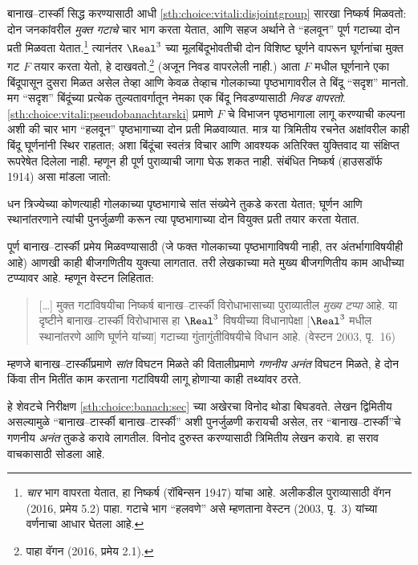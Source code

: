 बानाख--टार्स्की सिद्ध करण्यासाठी आधी \ref{sth:choice:vitali:disjointgroup} सारखा निष्कर्ष मिळवतो: दोन जनकांवरील \emph{मुक्त गटाचे} चार भाग करता येतात, आणि सहज अर्थाने ते “हलवून” पूर्ण गटाच्या दोन प्रती मिळवता येतात.\footnote{\emph{चार} भाग वापरता येतात, हा निष्कर्ष (रॉबिन्सन 1947) यांचा आहे. अलीकडील पुराव्यासाठी वॅगन (2016, प्रमेय 5.2) पाहा. गटाचे भाग “हलवणे” असे म्हणताना वेस्टन (2003, पृ.~3) यांच्या वर्णनाचा आधार घेतला आहे.} त्यानंतर $\Real^3$ च्या मूलबिंदूभोवतीची दोन विशिष्ट घूर्णने वापरून घूर्णनांचा मुक्त गट $F$ तयार करता येतो, हे दाखवतो.\footnote{पाहा वॅगन (2016, प्रमेय 2.1).} (अजून निवड वापरलेली नाही.) आता $F$ मधील घूर्णनाने एका बिंदूपासून दुसरा मिळत असेल तेव्हा आणि केवळ तेव्हाच गोलकाच्या पृष्ठभागावरील ते बिंदू “सदृश” मानतो. मग “सदृश” बिंदूंच्या प्रत्येक तुल्यतावर्गातून नेमका एक बिंदू निवडण्यासाठी \emph{निवड वापरतो}. \ref{sth:choice:vitali:pseudobanachtarski} प्रमाणे $F$ चे विभाजन पृष्ठभागाला लागू करण्याची कल्पना अशी की चार भाग “हलवून” पृष्ठभागाच्या दोन प्रती मिळवाव्यात. मात्र या त्रिमितीय रचनेत अक्षांवरील काही बिंदू घूर्णनांनी स्थिर राहतात; अशा बिंदूंचा स्वतंत्र विचार आणि आवश्यक अतिरिक्त युक्तिवाद या संक्षिप्त रूपरेषेत दिलेला नाही. म्हणून ही पूर्ण पुराव्याची जागा घेऊ शकत नाही. संबंधित निष्कर्ष (हाउसडॉर्फ 1914) असा मांडला जातो:

\begin{thm}
धन त्रिज्येच्या कोणत्याही गोलकाच्या पृष्ठभागाचे सांत संख्येने तुकडे करता येतात; घूर्णन आणि स्थानांतरणाने त्यांची पुनर्जुळणी करून त्या पृष्ठभागाच्या दोन वियुक्त प्रती तयार करता येतात.
\end{thm}

पूर्ण बानाख--टार्स्की प्रमेय मिळवण्यासाठी (जे फक्त गोलकाच्या पृष्ठभागाविषयी नाही, तर अंतर्भागाविषयीही आहे) आणखी काही बीजगणितीय युक्त्या लागतात. तरी लेखकाच्या मते मुख्य बीजगणितीय काम आधीच्या टप्प्यावर आहे. म्हणून वेस्टन लिहितात:
\begin{quote}
  [\ldots] मुक्त गटांविषयीचा निष्कर्ष बानाख--टार्स्की विरोधाभासाच्या पुराव्यातील \emph{मुख्य टप्पा} आहे. या दृष्टीने बानाख--टार्स्की विरोधाभास हा $\Real^3$ विषयीच्या विधानापेक्षा [$\Real^3$ मधील स्थानांतरणे आणि घूर्णने यांच्या] गटाच्या गुंतागुंतीविषयीचे विधान आहे. (वेस्टन 2003, पृ.~16)
\end{quote}
म्हणजे बानाख--टार्स्कीप्रमाणे \emph{सांत} विघटन मिळते की वितालीप्रमाणे \emph{गणनीय अनंत} विघटन मिळते, हे दोन किंवा तीन मितींत काम करताना गटांविषयी लागू होणाऱ्या काही तथ्यांवर ठरते.

हे शेवटचे निरीक्षण \ref{sth:choice:banach:sec} च्या अखेरचा विनोद थोडा बिघडवते. लेखन द्विमितीय असल्यामुळे “बानाख--टार्स्की बानाख--टार्स्की” अशी पुनर्जुळणी करायची असेल, तर “बानाख--टार्स्की”चे गणनीय \emph{अनंत} तुकडे करावे लागतील. विनोद दुरुस्त करण्यासाठी त्रिमितीय लेखन करावे. हा सराव वाचकासाठी सोडला आहे.

